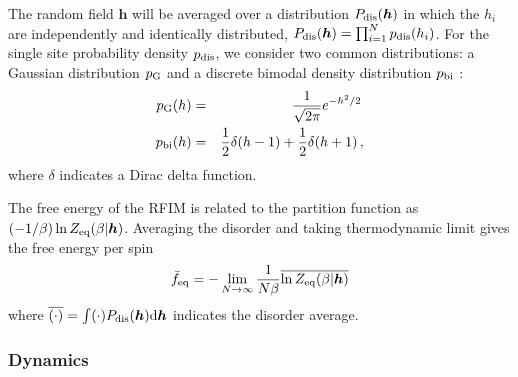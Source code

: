 \documentclass{iopart}
\begin{document}
The random field $\bm{h}$ will be averaged over a distribution $P_{\rm dis}(\bm{h})$ in which the $h_i$ are independently and identically distributed,
$P_{\rm dis}(\bm{h}) = \prod_{i=1}^{N} p_{\rm dis}(h_{i})$.  For the single site probability density $p_{\rm dis}$, we consider two common distributions: a Gaussian distribution $p_{\rm G}$ \cite{schneider1977random} and a discrete bimodal density distribution $p_{\rm bi}$ \cite{luttinger1976exactly,aharony1978tricritical}:
\begin{eqnarray}
  \label{eq:3:1}
  p_{\rm G}(h) &= & \frac{1}{\sqrt{2\pi}} e^{-h^{2}/{2}} \, \\
  \label{eq:3:2}
  p_{\rm bi}(h) & = & \frac{1}{2}\delta(h-1) + \frac{1}{2}\delta(h+1) \, ,
\end{eqnarray}
where $\delta$ indicates a Dirac delta function.

The free energy of the RFIM is related to the partition function as $(-1/\beta) \ln Z_{\rm eq}(\beta | \bm{h})$.  Averaging the disorder and taking thermodynamic limit gives the free energy per spin
\begin{equation}
\label{equ:bar-f-eq}
\bar{f}_{\rm eq} = -\lim_{N\to\infty} \frac{1}{N\beta} \overline{ \ln Z_{\rm eq}(\beta | \bm{h}) }
\end{equation}
where $\overline{(\cdot)} = \int (\cdot) P_{\rm dis}(\bm{h}) {\rm d}\bm{h}$  indicates the disorder average.

\subsubsection{Dynamics}\label{sec:theory:dyn}
\end{document}
